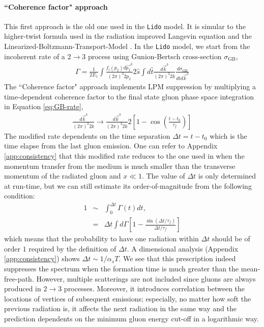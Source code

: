 \documentclass[aps, prc, reprint, amsmath, groupedaddress, nofootinbib]{revtex4-1}
\begin{document}
\paragraph*{``Coherence factor" approach} This first approach is the old one used in the {\tt Lido} model. 
It is simular to the higher-twist formula used in the radiation improved Langevin equation \cite{Cao:2013ita} and the Linearized-Boltzmann-Transport-Model \cite{Cao:2016gvr,Cao:2017hhk}.
In the {\tt Lido} model, we start from the incoherent rate of a $2\rightarrow 3$ process using Gunion-Bertsch cross-section $\sigma_\textrm{GB}$,
\begin{eqnarray}\label{eq:GB-rate}
\Gamma = \frac{1}{2E_1}\int\frac{f_i(p_2)d\vec{p_2}^3}{(2\pi)^3 2p_2}2\hat{s}\int d\hat{t}\frac{d\vec{k}^3}{(2\pi)^3 2k}\frac{d\sigma_{\textrm{GB}}}{d\hat{t}d\vec{k}^3}
\end{eqnarray}
The ``Coherence factor" approach implements LPM suppression by multiplying a time-dependent coherence factor to the final state gluon phase space integration in Equation \ref{eq:GB-rate},
\begin{eqnarray}\label{eq:GB-rate-LPM}
\frac{d\vec{k}^3}{(2\pi)^3 2k} \rightarrow \frac{d\vec{k}^3}{(2\pi)^3 2k} 2\left[1-\cos\left(\frac{t-t_0}{\tau_f}\right)\right]
\end{eqnarray}
The modified rate dependents on the time separation $\Delta t = t-t_0$ which is the time elapse from the last gluon emission.
One can refer to Appendix \ref{app:consistency} that this modified rate reduces to the one used in \cite{Cao:2013ita} when the momentum transfer from the medium is much smaller than the transverse momentum of the radiated gluon and $x\ll 1$.
The value of $\Delta t$ is only determined at run-time,
but we can still estimate its order-of-magnitude from the following condition:
\begin{eqnarray}\label{eq:delta-t-1}
\nonumber
1 &\sim& \int_0^{\Delta t}\Gamma(t) dt,\\
&=& \Delta t \int d\Gamma \left[1-\frac{\sin(\Delta t/\tau_f)}{\Delta t/\tau_f}\right]
\end{eqnarray}
which means that the probability to have one radiation within $\Delta t$ should be of order $1$ required by the definition of $\Delta t$.
A dimensional analysis (Appendix \ref{app:consistency}) shows $\Delta t \sim 1/\alpha_s T$.
We see that this prescription indeed suppresses the spectrum when the formation time is much greater than the mean-free-path. 
However, multiple scatterings are not included since gluons are always produced in $2\rightarrow3$ processes.
Moreover, it introduces correlation between the locations of vertices of subsequent emissions;
especially, no matter how soft the previous radiation is, it affects the next radiation in the same way and the prediction dependents on the minimum gluon energy cut-off in a logarithmic way.
\end{document}
